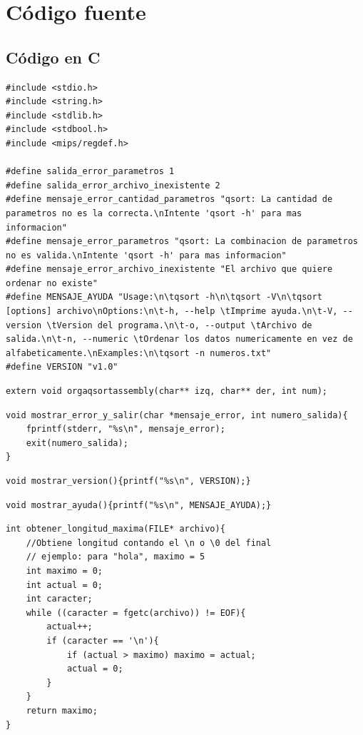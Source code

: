\documentclass[a4paper, 12pt]{article}
\begin{document}
	\newpage
	\section{Código fuente}
	
	
	\subsection{Código en C}
	
	\begin{lstlisting}
#include <stdio.h>
#include <string.h>
#include <stdlib.h>
#include <stdbool.h>
#include <mips/regdef.h>

#define salida_error_parametros 1
#define salida_error_archivo_inexistente 2
#define mensaje_error_cantidad_parametros "qsort: La cantidad de parametros no es la correcta.\nIntente 'qsort -h' para mas informacion"
#define mensaje_error_parametros "qsort: La combinacion de parametros no es valida.\nIntente 'qsort -h' para mas informacion"
#define mensaje_error_archivo_inexistente "El archivo que quiere ordenar no existe"
#define MENSAJE_AYUDA "Usage:\n\tqsort -h\n\tqsort -V\n\tqsort [options] archivo\nOptions:\n\t-h, --help \tImprime ayuda.\n\t-V, --version \tVersion del programa.\n\t-o, --output \tArchivo de salida.\n\t-n, --numeric \tOrdenar los datos numericamente en vez de alfabeticamente.\nExamples:\n\tqsort -n numeros.txt"
#define VERSION "v1.0"
	\end{lstlisting}
	
	\begin{lstlisting}
extern void orgaqsortassembly(char** izq, char** der, int num);
	\end{lstlisting}
	
	\begin{lstlisting}
void mostrar_error_y_salir(char *mensaje_error, int numero_salida){
    fprintf(stderr, "%s\n", mensaje_error);
    exit(numero_salida);
}
	\end{lstlisting}
	
	\begin{lstlisting}
void mostrar_version(){printf("%s\n", VERSION);}
	\end{lstlisting}
	
	\begin{lstlisting}
void mostrar_ayuda(){printf("%s\n", MENSAJE_AYUDA);}
	\end{lstlisting}
	
	\begin{lstlisting}
int obtener_longitud_maxima(FILE* archivo){
    //Obtiene longitud contando el \n o \0 del final
    // ejemplo: para "hola", maximo = 5
    int maximo = 0;
    int actual = 0;
    int caracter;
    while ((caracter = fgetc(archivo)) != EOF){
        actual++;
        if (caracter == '\n'){
            if (actual > maximo) maximo = actual;
            actual = 0;
        }
    }
    return maximo;
}
	\end{lstlisting}
	
\end{document}
